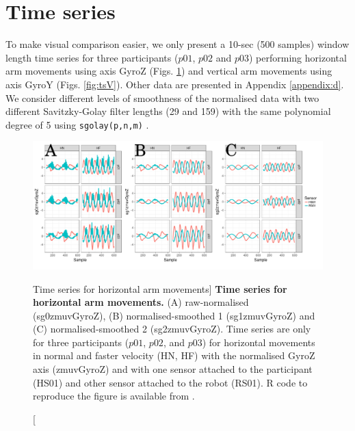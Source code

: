 \section{Time series}
To make visual comparison easier, we only present a 10-sec (500 samples) 
window length time series for three participants ($p01$, $p02$ and $p03$) 
performing horizontal 
arm movements using axis GyroZ (Figs. \ref{fig:tsH})
and  vertical arm movements using axis GyroY (Figs. \ref{fig:tsV}). 
Other data are presented in Appendix \ref{appendix:d}.
We consider different levels of smoothness of the normalised data 
with two different Savitzky-Golay filter lengths (29 and 159) 
with the same polynomial degree of 5 using \texttt{sgolay(p,n,m)} 
\citep{Rsignal}. 
\begin{figure}[!h]
  \centering
\includegraphics[width=1.0\textwidth]{tsHv03}
    	\caption
	[Time series for horizontal arm movements]{
	{\bf Time series for horizontal arm movements.}
		(A) raw-normalised (sg0zmuvGyroZ), 
		(B) normalised-smoothed 1 (sg1zmuvGyroZ) and
		(C) normalised-smoothed 2 (sg2zmuvGyroZ).
		Time series are only for three participants 
		($p01$, $p02$, and $p03$) 
		for horizontal movements in normal and faster velocity (HN, HF) 
		with the normalised GyroZ axis (zmuvGyroZ) 
		and with one sensor attached to the participant (HS01) 
		and other sensor attached to the robot (RS01).	
	R code to reproduce the figure is available from \cite{hwum2018}.
        }
    \label{fig:tsH}
\end{figure}

